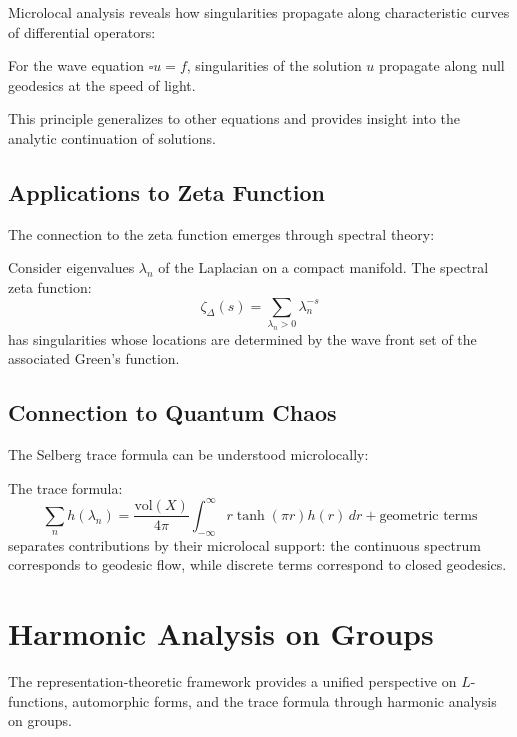 Microlocal analysis reveals how singularities propagate along characteristic curves of differential operators:

\begin{theorem}
For the wave equation $\square u = f$, singularities of the solution $u$ propagate along null geodesics at the speed of light.
\end{theorem}

This principle generalizes to other equations and provides insight into the analytic continuation of solutions.

\subsection{Applications to Zeta Function}

The connection to the zeta function emerges through spectral theory:

\begin{example}
Consider eigenvalues $\lambda_n$ of the Laplacian on a compact manifold. The spectral zeta function:
$$\zeta_{\Delta}(s) = \sum_{\lambda_n > 0} \lambda_n^{-s}$$
has singularities whose locations are determined by the wave front set of the associated Green's function.
\end{example}

\subsection{Connection to Quantum Chaos}

The Selberg trace formula can be understood microlocally:

\begin{remark}
The trace formula:
$$\sum_{n} h(\lambda_n) = \frac{\text{vol}(X)}{4\pi} \int_{-\infty}^{\infty} r \tanh(\pi r) h(r) \, dr + \text{geometric terms}$$
separates contributions by their microlocal support: the continuous spectrum corresponds to geodesic flow, while discrete terms correspond to closed geodesics.
\end{remark}

\section{Harmonic Analysis on Groups}
\label{sec:harmonic-analysis-groups}

The representation-theoretic framework provides a unified perspective on $L$-functions, automorphic forms, and the trace formula through harmonic analysis on groups.

